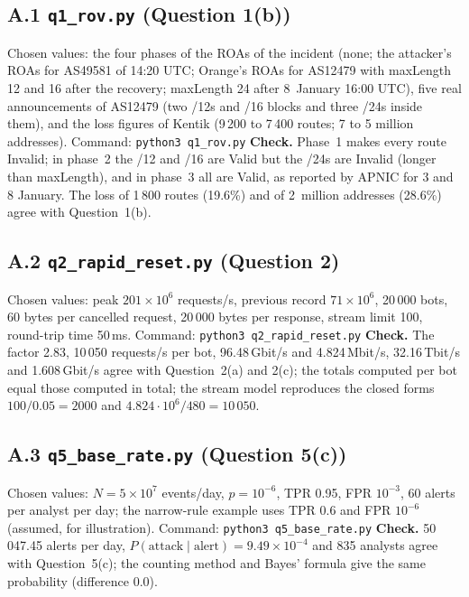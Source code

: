 \documentclass[11pt,a4paper]{article}
\begin{document}
\needspace{12cm}
\subsection*{A.1 \texttt{q1\_rov.py} (Question 1(b))}
Chosen values: the four phases of the ROAs of the incident (none; the attacker's ROAs for AS49581 of 14:20 UTC; Orange's ROAs for AS12479 with maxLength 12 and 16
after the recovery; maxLength 24 after 8~January 16:00 UTC), five real announcements of AS12479 (two /12s and /16 blocks and three /24s inside them), and the
loss figures of Kentik (9\,200 to 7\,400 routes; 7 to 5 million addresses). Command: \texttt{python3 q1\_rov.py}
\textbf{Check.} Phase~1 makes every route Invalid; in phase~2 the /12 and /16 are Valid but the /24s are Invalid (longer than maxLength), and in phase~3 all are Valid, as
reported by APNIC for 3 and 8 January. The loss of 1\,800 routes (19.6\%) and of 2~million addresses (28.6\%) agree with Question~1(b).

\clearpage
\needspace{13cm}
\subsection*{A.2 \texttt{q2\_rapid\_reset.py} (Question 2)}
Chosen values: peak $201\times10^{6}$ requests/s, previous record $71\times10^{6}$, 20\,000 bots, 60 bytes per cancelled
request, 20\,000 bytes per response, stream limit 100, round-trip time 50\,ms. Command: \texttt{python3 q2\_rapid\_reset.py}
\textbf{Check.} The factor 2.83, 10\,050 requests/s per bot, 96.48\,Gbit/s and 4.824\,Mbit/s, 32.16\,Tbit/s and 1.608\,Gbit/s agree
with Question~2(a) and 2(c); the totals computed per bot equal those computed in total; the stream model reproduces the closed forms
$100/0.05=2000$ and $4.824\cdot10^{6}/480=10\,050$.

\needspace{15cm}
\subsection*{A.3 \texttt{q5\_base\_rate.py} (Question 5(c))}
Chosen values: $N=5\times10^{7}$ events/day, $p=10^{-6}$, TPR 0.95, FPR $10^{-3}$, 60 alerts per analyst per day; the narrow-rule
example uses TPR 0.6 and FPR $10^{-6}$ (assumed, for illustration). Command: \texttt{python3 q5\_base\_rate.py}
\textbf{Check.} 50\,047.45 alerts per day, $P(\text{attack}\mid\text{alert})=9.49\times10^{-4}$ and 835 analysts agree with
Question~5(c); the counting method and Bayes' formula give the same probability (difference 0.0).
\end{document}
